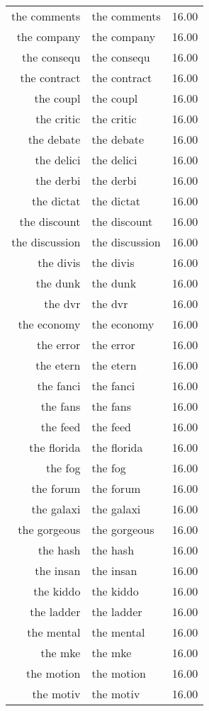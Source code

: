 \begin{table}[ht]
\begin{tabular}{rlr}
  the comments & the comments & 16.00 \\ 
  the company & the company & 16.00 \\ 
  the consequ & the consequ & 16.00 \\ 
  the contract & the contract & 16.00 \\ 
  the coupl & the coupl & 16.00 \\ 
  the critic & the critic & 16.00 \\ 
  the debate & the debate & 16.00 \\ 
  the delici & the delici & 16.00 \\ 
  the derbi & the derbi & 16.00 \\ 
  the dictat & the dictat & 16.00 \\ 
  the discount & the discount & 16.00 \\ 
  the discussion & the discussion & 16.00 \\ 
  the divis & the divis & 16.00 \\ 
  the dunk & the dunk & 16.00 \\ 
  the dvr & the dvr & 16.00 \\ 
  the economy & the economy & 16.00 \\ 
  the error & the error & 16.00 \\ 
  the etern & the etern & 16.00 \\ 
  the fanci & the fanci & 16.00 \\ 
  the fans & the fans & 16.00 \\ 
  the feed & the feed & 16.00 \\ 
  the florida & the florida & 16.00 \\ 
  the fog & the fog & 16.00 \\ 
  the forum & the forum & 16.00 \\ 
  the galaxi & the galaxi & 16.00 \\ 
  the gorgeous & the gorgeous & 16.00 \\ 
  the hash & the hash & 16.00 \\ 
  the insan & the insan & 16.00 \\ 
  the kiddo & the kiddo & 16.00 \\ 
  the ladder & the ladder & 16.00 \\ 
  the mental & the mental & 16.00 \\ 
  the mke & the mke & 16.00 \\ 
  the motion & the motion & 16.00 \\ 
  the motiv & the motiv & 16.00 \\ 

\end{tabular}
\end{table}
